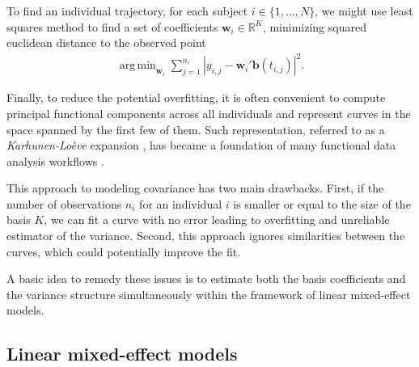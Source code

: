 \documentclass[preprint]{imsart}
\numberwithin{equation}{section}
\theoremstyle{plain}
\newcommand{\R}{\mathbb{R}}
\newcommand{\bb}{\mathbf{b}}
\newcommand{\bw}{\mathbf{w}}
\DeclareMathOperator*{\argmin}{arg\,min}
\begin{document}
To find an individual trajectory, for each subject $i \in \{ 1,...,N \}$, we might use least squares method to find a set of coefficients $\bw_i \in \R^K$, minimizing squared euclidean distance to the observed point
\begin{align}\label{eq:direct-individual}
 \argmin_{\bw_i}\sum_{j=1}^{n_i}\left|y_{i,j} - \bw_i'\bb(t_{i,j})\right|^2.
\end{align}

Finally, to reduce the potential overfitting, it is often convenient to compute principal functional components across all individuals and represent curves in the space spanned by the first few of them. Such representation, referred to as a {\it Karhunen-Lo\`eve} expansion \citep{watanabe1965karhunen,kosambi2016statistics}, has became a foundation of many functional data analysis workflows \citep{ramsay1991some,yao2005linear,cnaan1997tutorial,laird1988missing,horvath2012inference,besse1997simultaneous}. %

This approach to modeling covariance has two main drawbacks. First, if the number of observations $n_i$ for an individual $i$ is smaller or equal to the size of the basis $K$, we can fit a curve with no error leading to overfitting and unreliable estimator of the variance. Second, this approach ignores similarities between the curves, which could potentially improve the fit.

A basic idea to remedy these issues is to estimate both the basis coefficients and the variance structure simultaneously within the framework of linear mixed-effect models.

\subsection{Linear mixed-effect models}\label{ss:lmm}
\end{document}

